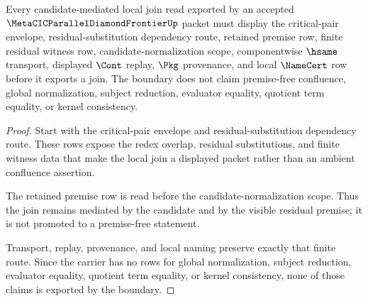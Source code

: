 \begin{theorem}
\label{thm:metacic-parallel-diamond-frontier-residual-premise-join-boundary}
Every candidate-mediated local join read exported by an accepted $\MetaCICParallelDiamondFrontierUp$ packet must display the critical-pair envelope, residual-substitution dependency route, retained premise row, finite residual witness row, candidate-normalization scope, componentwise $\hsame$ transport, displayed $\Cont$ replay, $\Pkg$ provenance, and local $\NameCert$ row before it exports a join. The boundary does not claim premise-free confluence, global normalization, subject reduction, evaluator equality, quotient term equality, or kernel consistency.
\end{theorem}
\begin{proof}
Start with the critical-pair envelope and residual-substitution dependency route. These rows expose the redex overlap, residual substitutions, and finite witness data that make the local join a displayed packet rather than an ambient confluence assertion.

The retained premise row is read before the candidate-normalization scope. Thus the join remains mediated by the candidate and by the visible residual premise; it is not promoted to a premise-free statement.

Transport, replay, provenance, and local naming preserve exactly that finite route. Since the carrier has no rows for global normalization, subject reduction, evaluator equality, quotient term equality, or kernel consistency, none of those claims is exported by the boundary.
\end{proof}
